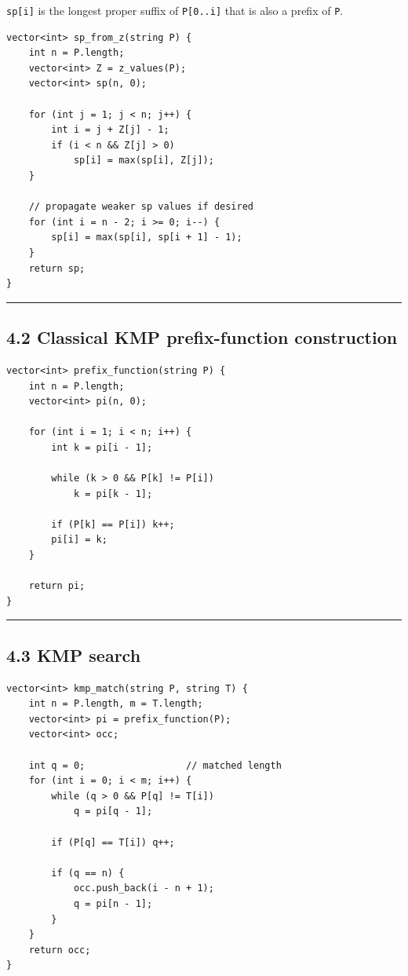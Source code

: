 \documentclass[11pt]{article}
\begin{document}
\texttt{sp[i]} is the longest proper suffix of \texttt{P[0..i]} that is also a prefix of \texttt{P}.

\begin{verbatim}
vector<int> sp_from_z(string P) {
    int n = P.length;
    vector<int> Z = z_values(P);
    vector<int> sp(n, 0);

    for (int j = 1; j < n; j++) {
        int i = j + Z[j] - 1;
        if (i < n && Z[j] > 0)
            sp[i] = max(sp[i], Z[j]);
    }

    // propagate weaker sp values if desired
    for (int i = n - 2; i >= 0; i--) {
        sp[i] = max(sp[i], sp[i + 1] - 1);
    }
    return sp;
}
\end{verbatim}

\begin{center}\rule{0.5\linewidth}{0.5pt}\end{center}

\subsection{4.2 Classical KMP prefix-function construction}\label{classical-kmp-prefix-function-construction}

\begin{verbatim}
vector<int> prefix_function(string P) {
    int n = P.length;
    vector<int> pi(n, 0);

    for (int i = 1; i < n; i++) {
        int k = pi[i - 1];

        while (k > 0 && P[k] != P[i])
            k = pi[k - 1];

        if (P[k] == P[i]) k++;
        pi[i] = k;
    }

    return pi;
}
\end{verbatim}

\begin{center}\rule{0.5\linewidth}{0.5pt}\end{center}

\subsection{4.3 KMP search}\label{kmp-search}

\begin{verbatim}
vector<int> kmp_match(string P, string T) {
    int n = P.length, m = T.length;
    vector<int> pi = prefix_function(P);
    vector<int> occ;

    int q = 0;                  // matched length
    for (int i = 0; i < m; i++) {
        while (q > 0 && P[q] != T[i])
            q = pi[q - 1];

        if (P[q] == T[i]) q++;

        if (q == n) {
            occ.push_back(i - n + 1);
            q = pi[n - 1];
        }
    }
    return occ;
}
\end{verbatim}
\end{document}
